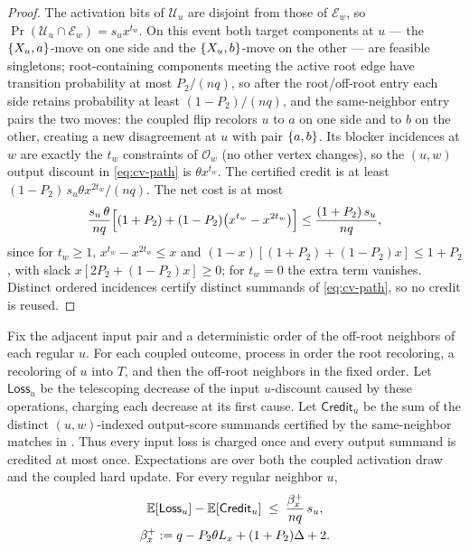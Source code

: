 \begin{proof}
The activation bits of \(\mathcal U_u\) are disjoint from those of
\(\mathcal E_w\), so
\(\Pr(\mathcal U_u\cap\mathcal E_w)=s_u x^{t_w}\). On this event both target
components at $u$ --- the $\left\{X_u,a\right\}$-move on one side and the
$\left\{X_u,b\right\}$-move on the other --- are feasible singletons; root-containing
components meeting the active root edge have transition probability at most
$P_2/(nq)$, so after the root/off-root entry each side retains probability
at least $(1-P_2)/(nq)$, and the same-neighbor entry pairs the two moves: the coupled flip
recolors $u$ to $a$ on one side and to $b$ on the other, creating a new
disagreement at $u$ with pair $\left\{a,b\right\}$. Its blocker incidences at $w$
are exactly the \(t_w\) constraints of $\mathcal O_w$ (no other vertex
changes), so the $(u,w)$ output discount in \eqref{eq:cv-path} is
\(\theta x^{t_w}\). The certified credit is at least
\((1-P_2)\,s_u\theta x^{2t_w}/(nq)\). The net cost
is at most
\[
  \frac{s_u\,\theta}{nq}\Bigl[(1+P_2)
    +(1-P_2)\bigl(x^{t_w}-x^{2t_w}\bigr)\Bigr]
  \le\frac{(1+P_2)\,s_u}{nq},
\]
since for \(t_w\ge1\), \(x^{t_w}-x^{2t_w}\le x\) and
$(1-x)[(1+P_2)+(1-P_2)x]\le1+P_2$, with slack $x[2P_2+(1-P_2)x]\ge0$; for
\(t_w=0\) the extra term vanishes. Distinct ordered incidences certify distinct
summands of \eqref{eq:cv-path}, so no credit is reused.
\end{proof}

\begin{lemma}\label{lem:cv-expected}
Fix the adjacent input pair and a deterministic order of the off-root
neighbors of each regular \(u\).  For each coupled outcome, process in order
the root recoloring, a recoloring of \(u\) into \(T\), and then the
off-root neighbors in the fixed order.  Let \(\mathsf{Loss}_u\) be the
telescoping decrease of the input \(u\)-discount caused by these operations,
charging each decrease at its first cause.  Let \(\mathsf{Credit}_u\) be the
sum of the distinct \((u,w)\)-indexed output-score summands certified by the
same-neighbor matches in .
Thus every input loss is charged once and every output summand is credited at
most once.  Expectations are over both the coupled activation draw and the
coupled hard update.  For every regular neighbor \(u\),
\begin{gather*}
  \operatorname{\mathbb{E}}[\mathsf{Loss}_u]-\operatorname{\mathbb{E}}[\mathsf{Credit}_u]
  \;\le\;\frac{\beta^{+}_x}{nq}\,s_u ,\\
  \beta^{+}_x:=q-P_2\theta L_x+(1+P_2)\Delta+2 .
\end{gather*}
\end{lemma}

